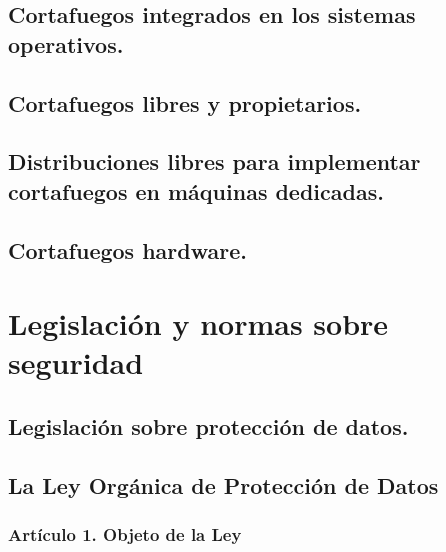 \documentclass[letterpaper,10pt,spanish]{sphinxmanual}
\begin{document}
\section{Cortafuegos integrados en los sistemas operativos.}
\label{\detokenize{tema_cortafuegos/tema_cortafuegos:cortafuegos-integrados-en-los-sistemas-operativos}}

\section{Cortafuegos libres y propietarios.}
\label{\detokenize{tema_cortafuegos/tema_cortafuegos:cortafuegos-libres-y-propietarios}}

\section{Distribuciones libres para implementar cortafuegos en máquinas dedicadas.}
\label{\detokenize{tema_cortafuegos/tema_cortafuegos:distribuciones-libres-para-implementar-cortafuegos-en-maquinas-dedicadas}}

\section{Cortafuegos hardware.}
\label{\detokenize{tema_cortafuegos/tema_cortafuegos:cortafuegos-hardware}}

\chapter{Legislación y normas sobre seguridad}
\label{\detokenize{tema_lopd/tema_lopd:legislacion-y-normas-sobre-seguridad}}\label{\detokenize{tema_lopd/tema_lopd::doc}}

\section{Legislación sobre protección de datos.}
\label{\detokenize{tema_lopd/tema_lopd:legislacion-sobre-proteccion-de-datos}}

\section{La Ley Orgánica de Protección de Datos}
\label{\detokenize{tema_lopd/tema_lopd:la-ley-organica-de-proteccion-de-datos}}

\subsection{Artículo 1. Objeto de la Ley}
\label{\detokenize{tema_lopd/tema_lopd:articulo-1-objeto-de-la-ley}}
\end{document}
